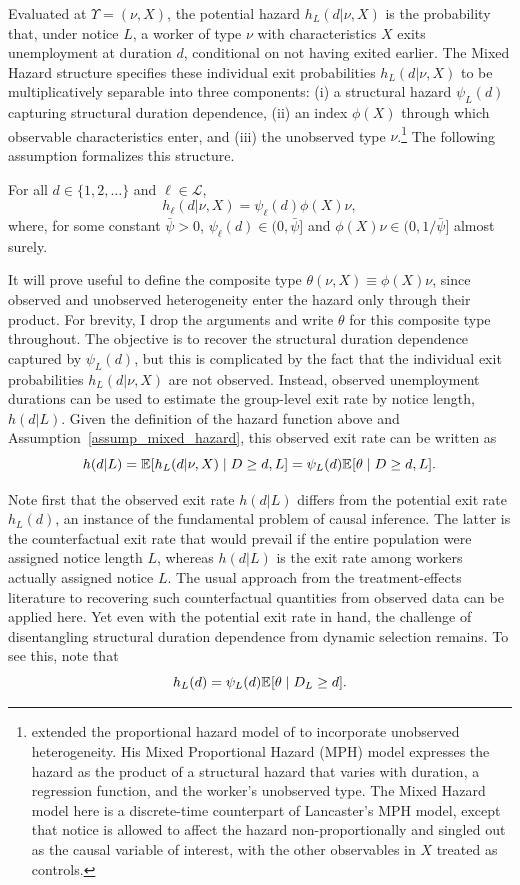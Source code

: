 \documentclass{div}
\begin{document}
Evaluated at \(\Upsilon = (\nu, X)\), the potential hazard \(h_L(d|\nu, X)\) is the probability that, under notice \(L\), a worker of type \(\nu\) with characteristics \(X\) exits unemployment at duration \(d\), conditional on not having exited earlier. The Mixed Hazard structure specifies these individual exit probabilities \(h_L(d|\nu, X)\) to be multiplicatively separable into three components: (i) a structural hazard \(\psi_L(d)\) capturing structural duration dependence, (ii) an index \(\phi(X)\) through which observable characteristics enter, and (iii) the unobserved type \(\nu\).\footnote{\cite{Lancaster1979} extended the proportional hazard model of \cite{Cox1972} to incorporate unobserved heterogeneity. His Mixed Proportional Hazard (MPH) model expresses the hazard as the product of a structural hazard that varies with duration, a regression function, and the worker's unobserved type. The Mixed Hazard model here is a discrete-time counterpart of Lancaster's MPH model, except that notice is allowed to affect the hazard non-proportionally and singled out as the causal variable of interest, with the other observables in $X$ treated as controls.}
The following assumption formalizes this structure.

\begin{assump}\label{assump_mixed_hazard}
For all $d \in \{1, 2, \ldots\}$ and $\ell \in \mathcal{L}$,
\[
    h_\ell(d| \nu, X) = \psi_\ell(d) \phi(X)\nu,
\]
where, for some constant $\bar{\psi} > 0$, $\psi_\ell(d) \in (0, \bar{\psi}]$ and $\phi(X)\nu \in (0, 1/\bar{\psi}]$ almost surely.
\end{assump}


It will prove useful to define the composite type \(\theta(\nu, X) \equiv \phi(X)\nu\), since observed and unobserved heterogeneity enter the hazard only through their product. For brevity, I drop the arguments and write $\theta$ for this composite type throughout. The objective is to recover the structural duration dependence captured by \(\psi_{L}(d)\), but this is complicated by the fact that the individual exit probabilities $h_L(d|\nu, X)$ are not observed. Instead, observed unemployment durations can be used to estimate the group-level exit rate by notice length, $h(d|L)$. Given the definition of the hazard function above and Assumption~\ref{assump_mixed_hazard}, this observed exit rate can be written as
\[
h(d|L) = \E[h_L(d|\nu, X) \mid D \geq d, L] = \psi_L(d)\E[\theta \mid D \geq d, L].
\]

Note first that the observed exit rate $h(d|L)$ differs from the potential exit rate $h_L(d)$, an instance of the fundamental problem of causal inference. The latter is the counterfactual exit rate that would prevail if the entire population were assigned notice length $L$, whereas $h(d|L)$ is the exit rate among workers actually assigned notice $L$. The usual approach from the treatment-effects literature to recovering such counterfactual quantities from observed data can be applied here. Yet even with the potential exit rate in hand, the challenge of disentangling structural duration dependence from dynamic selection remains. To see this, note that
\[
h_L(d) = \psi_L(d)\E[\theta \mid D_L \geq d].
\]
\end{document}
